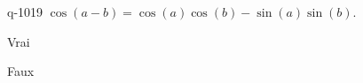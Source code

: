 \begin{truefalse}{q-1019}
$\cos(a-b)=\cos(a)\cos(b)-\sin(a)\sin(b)$.
\item Vrai
\item* Faux
\end{truefalse}

